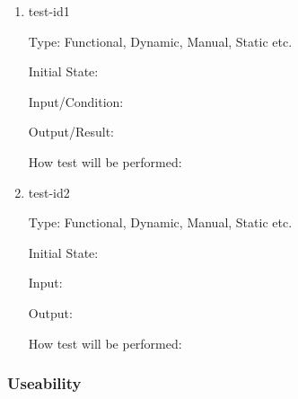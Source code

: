 \documentclass[12pt, titlepage]{article}
\begin{document}
\begin{enumerate}

\item{test-id1\\}

Type: Functional, Dynamic, Manual, Static etc.
					
Initial State: 
					
Input/Condition: 
					
Output/Result: 
					
How test will be performed: 
					
\item{test-id2\\}

Type: Functional, Dynamic, Manual, Static etc.
					
Initial State: 
					
Input: 
					
Output: 
					
How test will be performed: 

\end{enumerate}

\subsubsection{Useability}
\end{document}
